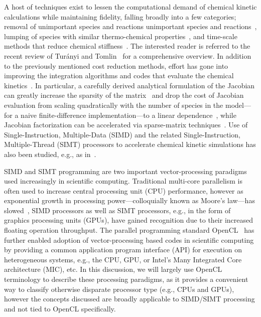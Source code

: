 \documentclass[12pt,number,sort&compress,preprint]{elsarticle}
\begin{document}
A host of techniques exist to lessen the computational demand of chemical kinetic calculations while maintaining fidelity, falling broadly into a few categories; removal of unimportant species and reactions unimportant species and reactions~\cite{Lu:2006bb,Pepiot-Desjardins:2008,Hiremath:2010jw,Niemeyer:2010bt,Curtis:2015}, lumping of species with similar thermo-chemical properties~\cite{Lu:2007,Ahmed:2007fa,Pepiot:2008kq}, and time-scale methods that reduce chemical stiffness~\cite{Maas:1992ws,Lam:1994ws,Lu:2001ve,Gou:2010}.
The interested reader is referred to the recent review of Tur\'anyi and Tomlin~\cite{turanyi2016analysis} for a comprehensive overview.
In addition to the previously mentioned cost reduction methods, effort has gone into improving the integration algorithms and codes that evaluate the chemical kinetics~\cite{Gou:2010,SCHWER2002270,Niemeyer:2016aa,GAO2015287}.
In particular, a carefully derived analytical formulation of the Jacobian can greatly increase the sparsity of the matrix~\cite{SCHWER2002270} and drop the cost of Jacobian evaluation from scaling quadratically with the number of species in the model---for a naive finite-difference implementation---to a linear dependence~\cite{LU2009192}, while Jacobian factorization can be accelerated via sparse-matrix techniques~\cite{superlu99}.
Use of Single-Instruction, Multiple-Data (SIMD) and the related Single-Instruction, Multiple-Thread (SIMT) processors to accelerate chemical kinetic simulations has also been studied, e.g., as in~\cite{CurtisGPU:2017,Sewerin20151375,Shi:2012aa,Niemeyer:2016aa}.

SIMD and SIMT programming are two important vector-processing paradigms used increasingly in scientific computing.
Traditional multi-core parallelism is often used to increase central processing unit (CPU) performance, however as exponential growth in processing power---colloquially known as Moore's law---has slowed~\cite{khan2018science}, SIMD processors as well as SIMT processors, e.g., in the form of graphics processing units (GPUs), have gained recognition due to their increased floating operation throughput.
The parallel programming standard OpenCL~\cite{stone2010opencl} has further enabled adoption of vector-processing based codes in scientific computing by providing a common application program interface (API) for execution on heterogeneous systems, e.g., the CPU, GPU, or Intel's Many Integrated Core architecture (MIC), etc.
In this discussion, we will largely use OpenCL terminology to describe these processing paradigms, as it provides a convenient way to classify otherwise disparate processor type (e.g., CPUs and GPUs), however the concepts discussed are broadly applicable to SIMD\slash SIMT processing and not tied to OpenCL specifically.
\end{document}
